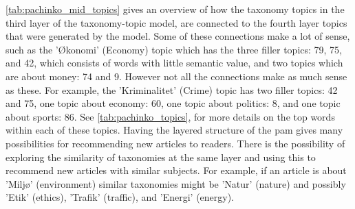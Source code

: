\autoref{tab:pachinko_mid_topics} gives an overview of how the taxonomy topics in the third layer of the taxonomy-topic model, are connected to the fourth layer topics that were generated by the model.
Some of these connections make a lot of sense, such as the 'Økonomi' (Economy) topic which has the three filler topics: 79, 75, and 42, which consists of words with little semantic value, and two topics which are about money: 74 and 9.
However not all the connections make as much sense as these. 
For example, the 'Kriminalitet' (Crime) topic has two filler topics: 42 and 75, one topic about economy: 60, one topic about politics: 8, and one topic about sports: 86.
See \autoref{tab:pachinko_topics}, for more details on the top words within each of these topics.
Having the layered structure of the \gls{pam} gives many possibilities for recommending new articles to readers.
There is the possibility of exploring the similarity of taxonomies at the same layer and using this to recommend new articles with similar subjects.
For example, if an article is about 'Miljø' (environment) similar taxonomies might be 'Natur' (nature) and possibly 'Etik' (ethics), 'Trafik' (traffic), and 'Energi' (energy).

